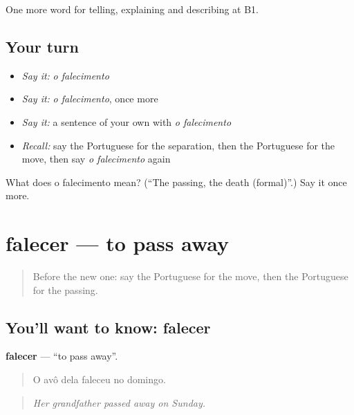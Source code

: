 \begin{grammarlens}[title={What you've built}]
One more word for telling, explaining and describing at B1.
\end{grammarlens}

\subsection*{Your turn}
\begin{itemize}
\raggedright
  \item \emph{Say it:} \emph{o falecimento}
  \item \emph{Say it:} \emph{o falecimento}, once more
  \item \emph{Say it:} a sentence of your own with \emph{o falecimento}
  \item \emph{Recall:} say the Portuguese for the separation, then the Portuguese for the move, then say \emph{o falecimento} again
\end{itemize}

\begin{tcolorbox}[breakable,colback=teal!4,colframe=teal!35!black,title={Before you move on}]
What does o falecimento mean? (\textquotedblleft{}The passing, the death (formal)\textquotedblright{}.) Say it once more.
\end{tcolorbox}
\section[falecer]{falecer — to pass away}

\label{lesson:PT-C314-falecer}



\begin{quote}
Before the new one: say the Portuguese for the move, then the Portuguese for the passing.
\end{quote}

\subsection*{You'll want to know: falecer}
\textbf{falecer} — \textquotedblleft{}to pass away\textquotedblright{}.

\begin{quote}
O avô dela faleceu no domingo.
\end{quote}

\begin{quote}
\emph{Her grandfather passed away on Sunday.}
\end{quote}

